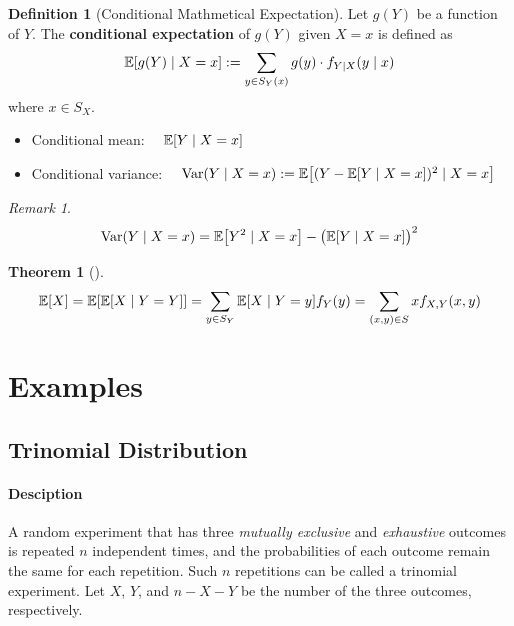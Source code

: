 \documentclass[10pt,UTF8]{article}
\newenvironment{definition box}
{\begin{tcolorbox}[colback=blue!5!white,colframe=blue!75!black,parbox=false,before upper=\par,before lower=\par]}
{\end{tcolorbox}}
\newenvironment{theorem box}
{\begin{tcolorbox}[colback=yellow!5!white,colframe=yellow!75!black,parbox=false,before upper=\par,before lower=\par]}
{\end{tcolorbox}}
\theoremstyle{definition}
\newtheorem{definition inner}{Definition}[section]
\newenvironment{definition}[1][]
{\begin{definition box}\begin{definition inner}[#1]\hfill\par}
{\end{definition inner}\end{definition box}}
\theoremstyle{plain}
\newtheorem{theorem inner}{Theorem}[section]
\newenvironment{theorem}[1][]
{\begin{theorem box}\begin{theorem inner}[#1]\hfill\par}
{\end{theorem inner}\end{theorem box}}
\theoremstyle{definition}
\newtheorem*{proof inner}{\textit{Proof}}
\theoremstyle{remark}
\newtheorem*{remark}{\textit{Remark}}
\newcommand{\E}[1]{\mathbb{E}\qty[#1]}  %
\newcommand{\Var}{\mathrm{Var}\qty}  %
\begin{document}
\begin{definition}[Conditional Mathmetical Expectation]
    Let $g(Y)$ be a function of $Y$. The \textbf{conditional expectation} of
    $g(Y)$ given $X=x$ is defined as
    \begin{equation*}
        \E{g(Y)\mid X=x} := \sum_{y\in S_Y(x)}g(y)\cdot f_{Y|X}(y\mid x)
    \end{equation*}
    where $x\in S_X$.
    \begin{itemize}
        \item Conditional mean:
        $\quad \E{Y\mid X=x}$
        \item Conditional variance:
        $\quad \Var(Y\mid X=x) := \E{(Y-\E{Y\mid X=x})^2\mid X=x}$
    \end{itemize}
\end{definition}
\begin{remark}
    \begin{equation*}
        \Var(Y\mid X=x) = \E{Y^2\mid X=x} - \big(\E{Y\mid X=x}\big)^2
    \end{equation*}
\end{remark}

\begin{theorem}
    \begin{equation*}
        \E{X} = \E{\E{X\mid Y=Y}} = \sum_{y\in S_Y}\E{X\mid Y=y}f_Y(y)
        = \sum_{(x,y)\in S} x f_{X,Y}(x,y)
    \end{equation*}
\end{theorem}


\section{Examples}

\subsection{Trinomial Distribution}

\paragraph{Desciption}
A random experiment that has three \emph{mutually exclusive}
and \emph{exhaustive} outcomes is repeated $n$ independent times,
and the probabilities of each outcome remain the same
for each repetition.
Such $n$ repetitions can be called a trinomial experiment.
Let $X$, $Y$, and $n-X-Y$ be the number of the three outcomes,
respectively.
\end{document}
